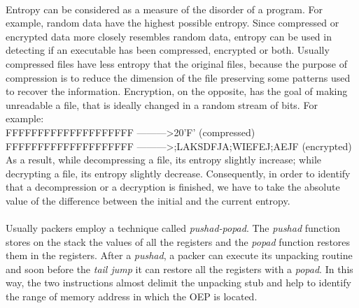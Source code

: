 \paragraph{}
Entropy can be considered as a measure of the disorder of a program. For example, random data have the highest possible entropy. Since compressed or encrypted data more closely resembles random data, entropy can be used in detecting if an executable has been compressed, encrypted or both. Usually compressed files have less entropy that the original files, because the purpose of compression is to reduce the dimension of the file preserving some patterns used to recover the information. Encryption, on the opposite, has the goal of making unreadable a file, that is ideally changed in a random stream of bits. For example:\\
FFFFFFFFFFFFFFFFFFFF ---------\textgreater 20'F' (compressed)\\
FFFFFFFFFFFFFFFFFFFF ---------\textgreater ;LAKSDFJA;WIEFEJ;AEJF (encrypted)\\
As a result, while decompressing a file, its entropy slightly increase; while decrypting a file, its entropy slightly decrease. Consequently, in order to identify that a decompression or a decryption is finished, we have to take the absolute value of the difference between the initial and the current entropy.\\
\paragraph{}
Usually packers employ a technique called \textit{pushad-popad}. The \textit{pushad} function stores on the stack the values of all the registers and the \textit{popad} function restores them in the registers. After a \textit{pushad}, a packer can execute its unpacking routine and soon before the \textit{tail jump} it can restore all the registers with a \textit{popad}. In this way, the two instructions almost delimit the unpacking stub and help to identify the range of memory address in which the OEP is located.\\ 